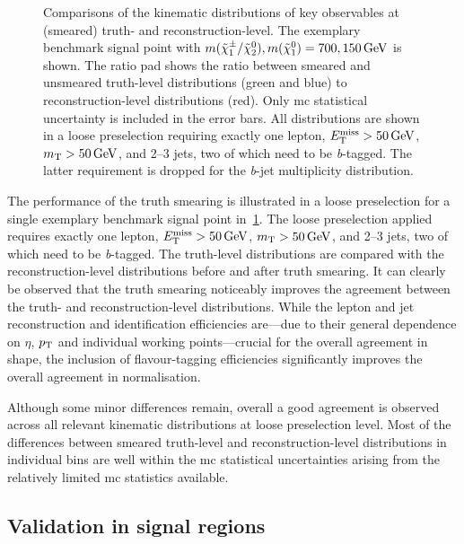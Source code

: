\begin{figure}
\begin{subfigure}[b]{0.45\linewidth}
	\end{subfigure}\hfill
	\caption{Comparisons of the kinematic distributions of key observables at (smeared) truth- and reconstruction-level. The exemplary benchmark signal point with $m(\charg/\neutr), m(\lsp) = 700, \SI{150}{\GeV}$ is shown. The ratio pad shows the ratio between smeared and unsmeared truth-level distributions (green and blue) to reconstruction-level distributions (red). Only \gls{mc} statistical uncertainty is included in the error bars. All distributions are shown in a loose preselection requiring exactly one lepton, $\met>\SI{50}{\GeV}$, $\mt > \SI{50}{\GeV}$, and 2--3 jets, two of which need to be \textit{b}-tagged. The latter requirement is dropped for the \textit{b}-jet multiplicity distribution.}
	\label{fig:smearing_preselection}
\end{figure}
 

 The performance of the truth smearing is illustrated in a loose preselection for a single exemplary benchmark signal point in~\cref{fig:smearing_preselection}. The loose preselection applied requires exactly one lepton, $\met>\SI{50}{\GeV}$, $\mt > \SI{50}{\GeV}$, and 2--3 jets, two of which need to be \textit{b}-tagged. The truth-level distributions are compared with the reconstruction-level distributions before and after truth smearing. It can clearly be observed that the truth smearing noticeably improves the agreement between the truth- and reconstruction-level distributions. While the lepton and jet reconstruction and identification efficiencies are---due to their general dependence on $\eta$, $p_{\textrm{T}}$ and individual working points---crucial for the overall agreement in shape, the inclusion of flavour-tagging efficiencies significantly improves the overall agreement in normalisation.
 
Although some minor differences remain, overall a good agreement is observed across all relevant kinematic distributions at loose preselection level. Most of the differences between smeared truth-level and reconstruction-level distributions in individual bins are well within the \gls{mc} statistical uncertainties arising from the relatively limited \gls{mc} statistics available.
 
 \subsection{Validation in signal regions}

